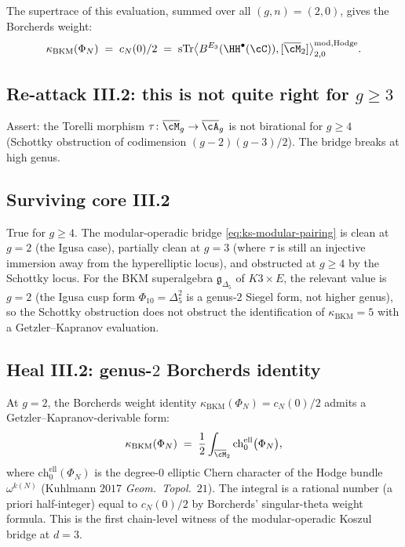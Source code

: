The supertrace of this evaluation, summed over all $(g, n) = (2, 0)$,
gives the Borcherds weight:
\begin{equation}
\label{eq:borcherds-weight-modular-operadic}
 \kappa_{\mathrm{BKM}}(\Phi_N) \;=\; c_N(0)/2
 \;=\; \mathrm{sTr}\bigl\langle B^{E_3}(\HH^\bullet(\cC)),
 [\overline{\cM}_2]\bigr\rangle^{\mathrm{mod, Hodge}}_{2, 0}.
\end{equation}

\subsection*{Re-attack III.2: this is not quite right for $g \geq 3$}

Assert: the Torelli morphism $\tau \colon \overline{\cM}_g \to
\overline{\cA}_g$ is not birational for $g \geq 4$ (Schottky
obstruction of codimension $(g - 2)(g - 3)/2$). The bridge breaks at
high genus.

\subsection*{Surviving core III.2}

True for $g \geq 4$. The modular-operadic bridge \eqref{eq:ks-modular-pairing}
is clean at $g = 2$ (the Igusa case), partially clean at $g = 3$ (where
$\tau$ is still an injective immersion away from the hyperelliptic
locus), and obstructed at $g \geq 4$ by the Schottky locus. For the
BKM superalgebra $\mathfrak{g}_{\Delta_5}$ of $K3 \times E$, the
relevant value is $g = 2$ (the Igusa cusp form $\Phi_{10} = \Delta_5^2$
is a genus-$2$ Siegel form, not higher genus), so the Schottky
obstruction does not obstruct the identification of $\kappa_{\mathrm{BKM}}
= 5$ with a Getzler--Kapranov evaluation.

\subsection*{Heal III.2: genus-$2$ Borcherds identity}

At $g = 2$, the Borcherds weight identity
$\kappa_{\mathrm{BKM}}(\Phi_N) = c_N(0)/2$ admits a
Getzler--Kapranov-derivable form:
\begin{equation}
\label{eq:kBKM-gk-witness}
 \kappa_{\mathrm{BKM}}(\Phi_N) \;=\; \frac{1}{2}
 \int_{\overline{\cM}_2} \mathrm{ch}_0^{\mathrm{ell}}\bigl(\Phi_N\bigr),
\end{equation}
where $\mathrm{ch}_0^{\mathrm{ell}}(\Phi_N)$ is the degree-$0$ elliptic
Chern character of the Hodge bundle $\omega^{k(N)}$ (Kuhlmann $2017$
\emph{Geom.\ Topol.}\ $21$). The integral is a rational number (a priori
half-integer) equal to $c_N(0)/2$ by Borcherds' singular-theta
weight formula. This is the first chain-level witness of the
modular-operadic Koszul bridge at $d = 3$.

